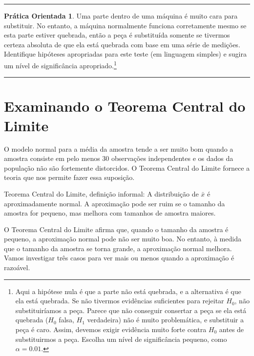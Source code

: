 \documentclass[
]{book}
\theoremstyle{definition}
\theoremstyle{definition}
\theoremstyle{definition}
\newtheorem{exercise}{Prática Orientada}[chapter]
\theoremstyle{definition}
\theoremstyle{remark}
\begin{document}
\begin{center}\rule{0.5\linewidth}{0.5pt}\end{center}

\begin{exercise}
\protect\hypertarget{exr:unnamed-chunk-176}{}{\label{exr:unnamed-chunk-176} }Uma parte dentro de uma máquina é muito cara para substituir. No entanto, a máquina normalmente funciona corretamente mesmo se esta parte estiver quebrada, então a peça é substituída somente se tivermos certeza absoluta de que ela está quebrada com base em uma série de medições. Identifique hipóteses apropriadas para este teste (em linguagem simples) e sugira um nível de significância apropriado.\footnote{Aqui a hipótese nula é que a parte não está quebrada, e a alternativa é que ela está quebrada. Se não tivermos evidências suficientes para rejeitar \(H_0\), não substituiríamos a peça. Parece que não conseguir consertar a peça se ela está quebrada (\(H_0\) falsa, \(H_1\) verdadeira) não é muito problemática, e substituir a peça é caro. Assim, devemos exigir evidência muito forte contra \(H_0\) antes de substituirmos a peça. Escolha um nível de significância pequeno, como \(\alpha=0.01\).}
\end{exercise}

\begin{center}\rule{0.5\linewidth}{0.5pt}\end{center}

\hypertarget{examiningCentralLimitTheorem}{%
\section{Examinando o Teorema Central do Limite}\label{examiningCentralLimitTheorem}}

O modelo normal para a média da amostra tende a ser muito bom quando a amostra consiste em pelo menos 30 observações independentes e os dados da população não são fortemente distorcidos. O Teorema Central do Limite fornece a teoria que nos permite fazer essa suposição.

Teorema Central do Limite, definição informal: A distribuição de \(\bar{x}\) é aproximadamente normal. A aproximação pode ser ruim se o tamanho da amostra for pequeno, mas melhora com tamanhos de amostra maiores.

O Teorema Central do Limite afirma que, quando o tamanho da amostra é pequeno, a aproximação normal pode não ser muito boa. No entanto, à medida que o tamanho da amostra se torna grande, a aproximação normal melhora. Vamos investigar três casos para ver mais ou menos quando a aproximação é razoável.
\end{document}
